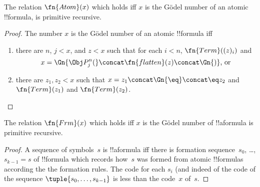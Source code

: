 \documentclass[../../include/open-logic-section]{subfiles}
\begin{document}

\begin{prop}
The relation $\fn{Atom}(x)$ which holds iff $x$ is the G\"odel number
of an atomic !!{formula}, is primitive recursive.
\end{prop}

\begin{proof}
The number $x$ is the G\"odel number of an atomic !!{formula} iff
\begin{enumerate}
\item there are $n$, $j < x$, and $z < x$ such that for each $i < n$,
  $\fn{Term}((z)_i)$ and
\[
x = \Gn{\Obj P^n_j(} \concat \fn{flatten}(z) \concat \Gn{)} \text{, or}
\]
\item there are $z_1, z_2 < x$ such that $x = z_1 \concat \Gn{\eq}
  \concat \eq z_2$ and $\fn{Term}(z_1)$ and $\fn{Term}(z_2)$.
\end{enumerate}
\end{proof}

\begin{prop}
The relation $\fn{Frm}(x)$ which holds iff $x$ is the G\"odel number
of !!a{formula} is primitive recursive.
\end{prop}

\begin{proof}
A sequence of symbols~$s$ is !!a{formula} iff there is formation
sequence~$s_0$, \dots, $s_{k-1} = s$ of !!{formula} which records
how~$s$ was formed from atomic !!{formula}s according the the
formation rules.  The code for each $s_i$ (and indeed of the code of
the sequence $\tuple{s_0, \dots, s_{k-1}}$ is less than the code~$x$
of~$s$.
\end{proof}
\end{document}
